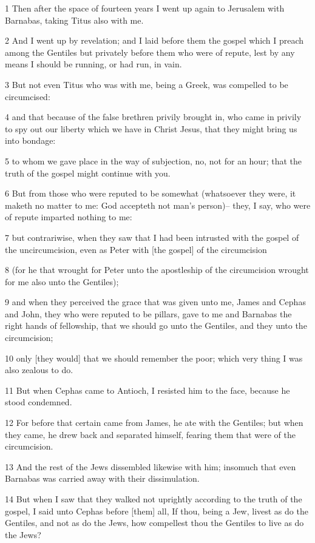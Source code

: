 \par 1 Then after the space of fourteen years I went up again to Jerusalem with Barnabas, taking Titus also with me.
\par 2 And I went up by revelation; and I laid before them the gospel which I preach among the Gentiles but privately before them who were of repute, lest by any means I should be running, or had run, in vain.
\par 3 But not even Titus who was with me, being a Greek, was compelled to be circumcised:
\par 4 and that because of the false brethren privily brought in, who came in privily to spy out our liberty which we have in Christ Jesus, that they might bring us into bondage:
\par 5 to whom we gave place in the way of subjection, no, not for an hour; that the truth of the gospel might continue with you.
\par 6 But from those who were reputed to be somewhat (whatsoever they were, it maketh no matter to me: God accepteth not man's person)-- they, I say, who were of repute imparted nothing to me:
\par 7 but contrariwise, when they saw that I had been intrusted with the gospel of the uncircumcision, even as Peter with [the gospel] of the circumcision
\par 8 (for he that wrought for Peter unto the apostleship of the circumcision wrought for me also unto the Gentiles);
\par 9 and when they perceived the grace that was given unto me, James and Cephas and John, they who were reputed to be pillars, gave to me and Barnabas the right hands of fellowship, that we should go unto the Gentiles, and they unto the circumcision;
\par 10 only [they would] that we should remember the poor; which very thing I was also zealous to do.
\par 11 But when Cephas came to Antioch, I resisted him to the face, because he stood condemned.
\par 12 For before that certain came from James, he ate with the Gentiles; but when they came, he drew back and separated himself, fearing them that were of the circumcision.
\par 13 And the rest of the Jews dissembled likewise with him; insomuch that even Barnabas was carried away with their dissimulation.
\par 14 But when I saw that they walked not uprightly according to the truth of the gospel, I said unto Cephas before [them] all, If thou, being a Jew, livest as do the Gentiles, and not as do the Jews, how compellest thou the Gentiles to live as do the Jews?
